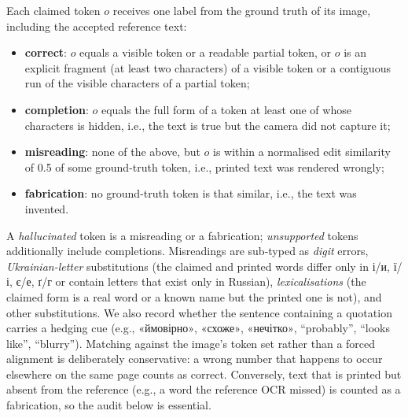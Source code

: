 Each claimed token $o$ receives one label from the ground truth of its image, including the accepted reference text:
\begin{itemize}
\item \textbf{correct}: $o$ equals a visible token or a readable partial token, or $o$ is an explicit fragment (at least two characters) of a visible token or a contiguous run of the visible characters of a partial token;
\item \textbf{completion}: $o$ equals the full form of a token at least one of whose characters is hidden, i.e., the text is true but the camera did not capture it;
\item \textbf{misreading}: none of the above, but $o$ is within a normalised edit similarity of 0.5 of some ground-truth token, i.e., printed text was rendered wrongly;
\item \textbf{fabrication}: no ground-truth token is that similar, i.e., the text was invented.
\end{itemize}
A \emph{hallucinated} token is a misreading or a fabrication; \emph{unsupported} tokens additionally include completions. Misreadings are sub-typed as \emph{digit} errors, \emph{Ukrainian-letter} substitutions (the claimed and printed words differ only in \foreignlanguage{ukrainian}{і/и, ї/і, є/е, ґ/г} or contain letters that exist only in Russian), \emph{lexicalisations} (the claimed form is a real word or a known name but the printed one is not), and other substitutions. We also record whether the sentence containing a quotation carries a hedging cue (e.g., \foreignlanguage{ukrainian}{«ймовірно»}, \foreignlanguage{ukrainian}{«схоже»}, \foreignlanguage{ukrainian}{«нечітко»}, ``probably'', ``looks like'', ``blurry''). Matching against the image's token set rather than a forced alignment is deliberately conservative: a wrong number that happens to occur elsewhere on the same page counts as correct. Conversely, text that is printed but absent from the reference (e.g., a word the reference OCR missed) is counted as a fabrication, so the audit below is essential.

